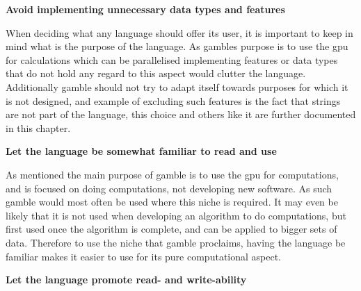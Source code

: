 \textbf{Avoid implementing unnecessary data types and features}

When deciding what any language should offer its user, it is important to keep in mind what is the purpose of the language.
As \glspl{gamble} purpose is to use the \acrshort{gpu} for calculations which can be parallelised implementing features or data types that do not hold any regard to this aspect would clutter the language.
Additionally \gls{gamble} should not try to adapt itself towards purposes for which it is not designed, and example of excluding such features is the fact that strings are not part of the language, this choice and others like it are further documented in this chapter.

\textbf{Let the language be somewhat familiar to read and use}

As mentioned the main purpose of \gls{gamble} is to use the \acrshort{gpu} for computations, and is focused on doing computations, not developing new software.
As such \gls{gamble} would most often be used where this niche is required.
It may even be likely that it is not used when developing an algorithm to do computations, but first used once the algorithm is complete, and can be applied to bigger sets of data.
Therefore to use the niche that \gls{gamble} proclaims, having the language be familiar makes it easier to use for its pure computational aspect.

\textbf{Let the language promote read- and write-ability}

